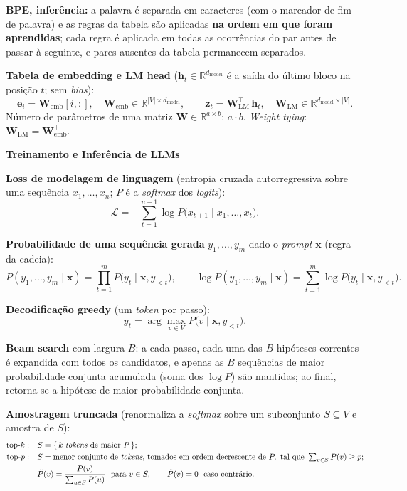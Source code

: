 \documentclass[11pt,a4paper]{article}
\newcommand{\bloco}[1]{%
  \par\vspace{0.3em}%
  {\bfseries\large #1}\par%
  \vspace{-0.4em}{\color{gray!60}\rule{\linewidth}{0.4pt}}\par%
}
\begin{document}
\textbf{BPE, inferência:} a palavra é separada em caracteres (com o marcador de fim de palavra) e as regras da tabela são aplicadas \textbf{na ordem em que foram aprendidas}; cada regra é aplicada em todas as ocorrências do par antes de passar à seguinte, e pares ausentes da tabela permanecem separados.

\textbf{Tabela de embedding e LM head} ($\mathbf{h}_t \in \mathbb{R}^{d_\text{model}}$ é a saída do último bloco na posição $t$; sem \textit{bias}):
\[
  \mathbf{e}_i = \mathbf{W}_\text{emb}[i,:], \quad \mathbf{W}_\text{emb} \in \mathbb{R}^{|V| \times d_\text{model}},
  \qquad
  \mathbf{z}_t = \mathbf{W}_\text{LM}^{\top}\,\mathbf{h}_t, \quad \mathbf{W}_\text{LM} \in \mathbb{R}^{d_\text{model} \times |V|}.
\]
Número de parâmetros de uma matriz $\mathbf{W} \in \mathbb{R}^{a \times b}$: $a \cdot b$. \textit{Weight tying}: $\mathbf{W}_\text{LM} = \mathbf{W}_\text{emb}^{\top}$.

\bloco{Treinamento e Inferência de LLMs}

\textbf{Loss de modelagem de linguagem} (entropia cruzada autorregressiva sobre uma sequência $x_1, \dots, x_n$; $P$ é a \textit{softmax} dos \textit{logits}):
\[
  \mathcal{L} = -\sum_{t=1}^{n-1} \log P\bigl(x_{t+1} \mid x_{1}, \dots, x_{t}\bigr).
\]

\textbf{Probabilidade de uma sequência gerada} $y_1, \dots, y_m$ dado o \textit{prompt} $\mathbf{x}$ (regra da cadeia):
\[
  P(y_1, \dots, y_m \mid \mathbf{x}) = \prod_{t=1}^{m} P\bigl(y_t \mid \mathbf{x}, y_{<t}\bigr),
  \qquad
  \log P(y_1, \dots, y_m \mid \mathbf{x}) = \sum_{t=1}^{m} \log P\bigl(y_t \mid \mathbf{x}, y_{<t}\bigr).
\]

\textbf{Decodificação greedy} (um \textit{token} por passo):
\[
  y_t = \arg\max_{v \in V} P\bigl(v \mid \mathbf{x}, y_{<t}\bigr).
\]

\textbf{Beam search} com largura $B$: a cada passo, cada uma das $B$ hipóteses correntes é expandida com todos os candidatos, e apenas as $B$ sequências de maior probabilidade conjunta acumulada (soma dos $\log P$) são mantidas; ao final, retorna-se a hipótese de maior probabilidade conjunta.

\textbf{Amostragem truncada} (renormaliza a \textit{softmax} sobre um subconjunto $S \subseteq V$ e amostra de $S$):
\begin{align*}
  \text{top-}k:\quad &S = \{\,k \text{ \textit{tokens} de maior } P\,\}; \\
  \text{top-}p:\quad &S = \text{menor conjunto de \textit{tokens}, tomados em ordem decrescente de } P, \text{ tal que } \textstyle\sum_{v \in S} P(v) \ge p; \\
  &\tilde{P}(v) = \frac{P(v)}{\sum_{u \in S} P(u)} \ \text{ para } v \in S, \qquad \tilde{P}(v) = 0 \ \text{ caso contrário}.
\end{align*}
\end{document}
